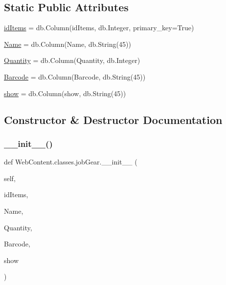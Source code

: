 \subsection*{Static Public Attributes}
\begin{DoxyCompactItemize}
\item 
\hyperlink{class_web_content_1_1classes_1_1job_gear_a3c06d5a64cb18ce600a7e015d7ad7e2e}{id\+Items} = db.\+Column(\textquotesingle{}id\+Items\textquotesingle{}, db.\+Integer, primary\+\_\+key=True)
\item 
\hyperlink{class_web_content_1_1classes_1_1job_gear_ac24ca34d6bcaedda98f1711e0733c8ed}{Name} = db.\+Column(\textquotesingle{}Name\textquotesingle{}, db.\+String(45))
\item 
\hyperlink{class_web_content_1_1classes_1_1job_gear_ad4f9a871b8c10bcdc1e3921b313620ca}{Quantity} = db.\+Column(\textquotesingle{}Quantity\textquotesingle{}, db.\+Integer)
\item 
\hyperlink{class_web_content_1_1classes_1_1job_gear_aa99b6c99df4ef2686d9a7ae05839e870}{Barcode} = db.\+Column(\textquotesingle{}Barcode\textquotesingle{}, db.\+String(45))
\item 
\hyperlink{class_web_content_1_1classes_1_1job_gear_ac60ca08b7517caefae54fd99e8c2f854}{show} = db.\+Column(\textquotesingle{}show\textquotesingle{}, db.\+String(45))
\end{DoxyCompactItemize}


\subsection{Constructor \& Destructor Documentation}
\mbox{\label{class_web_content_1_1classes_1_1job_gear_a65e8cf098ecea70db55ad9bd0a3639e2}} 
\subsubsection{\texorpdfstring{\+\_\+\+\_\+init\+\_\+\+\_\+()}{\_\_init\_\_()}}
{\footnotesize\ttfamily def Web\+Content.\+classes.\+job\+Gear.\+\_\+\+\_\+init\+\_\+\+\_\+ (\begin{DoxyParamCaption}\item[{}]{self,  }\item[{}]{id\+Items,  }\item[{}]{Name,  }\item[{}]{Quantity,  }\item[{}]{Barcode,  }\item[{}]{show }\end{DoxyParamCaption})}



